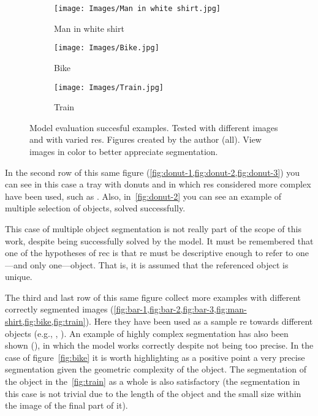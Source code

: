 \begin{figure}[p]
  \bigskip
  \begin{subfigure}[t]{.32\textwidth}
    \centering
    \caption{Man in white shirt}\label{fig:man-shirt}
    \texttt{[image: Images/Man in white shirt.jpg]}
  \end{subfigure}\hfill
  \begin{subfigure}[t]{.32\textwidth}
    \centering
    \caption{Bike}\label{fig:bike}
    \texttt{[image: Images/Bike.jpg]}
  \end{subfigure}\hfill
  \begin{subfigure}[t]{.32\textwidth}
    \centering
    \caption{Train}\label{fig:train}
    \texttt{[image: Images/Train.jpg]}
  \end{subfigure}
  \caption[Model evaluation succesful examples]{Model evaluation succesful
    examples. Tested with different images and with varied \glspl{re}. Figures
    created by the author (all). View images in color to better appreciate
    segmentation.}%
  \label{fig:success}
\end{figure}

In the second row of this same figure
(\vref{fig:donut-1,fig:donut-2,fig:donut-3}) you can see in this case a tray
with donuts and in which \glspl{re} considered more complex have been used,
such as . Also, in\ \vref{fig:donut-2} you can see an example
of multiple selection of objects, solved successfully.

\begin{remarkBox}
  This case of multiple object segmentation is not really part of the scope of
  this work, despite being successfully solved by the model. It must be
  remembered that one of the hypotheses of \gls{rec} is that \gls{re} must be
  descriptive enough to refer to one---and only one---object. That is, it is
  assumed that the referenced object is unique.
\end{remarkBox}

The third and last row of this same figure collect more examples with different
correctly segmented images
(\vref{fig:bar-1,fig:bar-2,fig:bar-3,fig:man-shirt,fig:bike,fig:train}). Here
they have been used as a sample \gls{re} towards different objects (e.g.,
, ). An example of highly complex segmentation has also been
shown (), in which the model works correctly despite not
being too precise. In the case of figure\ \vref{fig:bike} it is worth
highlighting as a positive point a very precise segmentation given the
geometric complexity of the object. The segmentation of the object 
in the\ \vref{fig:train} as a whole is also satisfactory (the segmentation in
this case is not trivial due to the length of the object and the small size
within the image of the final part of it).

